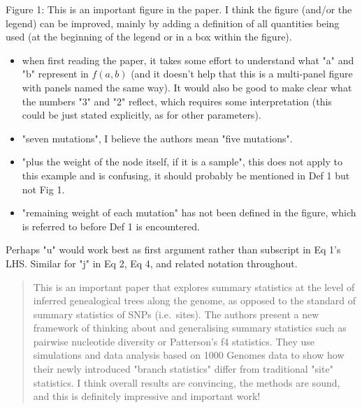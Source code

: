 \begin{point}{Figure 1:}
    This is an important figure in the paper. I think the figure (and/or the legend) can be improved, mainly by adding a definition of all quantities being used (at the beginning of the legend or in a box within the figure).
    \begin{itemize}
        \item when first reading the paper, it takes some effort to understand what "a" and "b" represent in $f(a,b)$
            (and it doesn't help that this is a multi-panel figure with panels named the same way).
            It would also be good to make clear what the numbers "3" and "2" reflect, which requires some interpretation (this could be just stated explicitly, as for other parameters).
        \item "seven mutations", I believe the authors mean "five mutations".
        \item "plus the weight of the node itself, if it is a sample", this does not apply to this example and is confusing, it should probably be mentioned in Def 1 but not Fig 1.
        \item "remaining weight of each mutation" has not been defined in the figure, which is referred to before Def 1 is encountered.
    \end{itemize}
\end{point}

\reply{
}

\begin{point}{}
    Perhaps "u" would work best as first argument rather than subscript in Eq 1's LHS. Similar for "j" in Eq 2, Eq 4, and related notation throughout.
\end{point}

\reply{
}





\begin{quote}
This is an important paper that explores summary statistics at the level of inferred genealogical trees along the genome, as opposed to the standard of summary statistics of SNPs (i.e.\ sites).
The authors present a new framework of thinking about and generalising summary statistics such as pairwise nucleotide diversity or Patterson's f4 statistics.
They use simulations and data analysis based on 1000 Genomes data to show how their newly introduced "branch statistics" differ from traditional "site" statistics.
I think overall results are convincing, the methods are sound, and this is definitely impressive and important work!
\end{quote}

